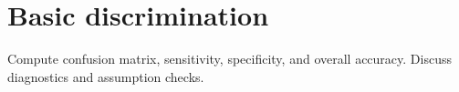 \section{Basic discrimination}

Compute confusion matrix, sensitivity, specificity, and overall accuracy. Discuss diagnostics and assumption checks.
